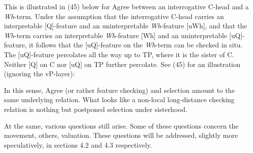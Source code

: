 \documentclass[output=paper
,modfonts
,nonflat]{langsci/langscibook}
\begin{document}
This is illustrated in (45) below for Agree between an interrogative C-head and a \textit{Wh}{}-term. Under the assumption that the interrogative C-head carries an interpretable [Q]-feature and an uninterpretable \textit{Wh}-feature [uWh], and that the \textit{Wh}{}-term carries an interpretable \textit{Wh}-feature [Wh] and an uninterpretable [uQ]-feature, it follows that the [uQ]-feature on the \textit{Wh}-term can be checked in situ. The [uQ]-feature percolates all the way up to TP, where it is the sister of C. Neither [Q] on C nor [uQ] on TP further percolate. See (45) for an illustration (ignoring the vP-layer):

\begin{figure}[!h]
	\begin{exe}
	\end{exe}
\end{figure}
\newpage \noindent In this sense, Agree (or rather feature checking) and selection amount to the same underlying relation. What looks like a non-local long-distance checking relation is nothing but postponed selection under sisterhood.

At the same, various questions still arise. Some of these questions concern the movement, others, valuation. These questions will be addressed, slightly more speculatively, in sections 4.2 and 4.3 respectively.
\end{document}
